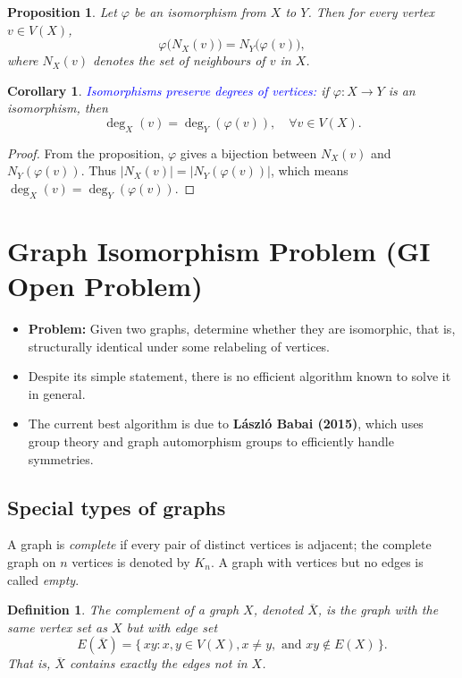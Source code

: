 \documentclass[12pt,a4paper,openany]{book}
\newtheorem{definition}{Definition}[section]
\newtheorem{proposition}{Proposition}[section]
\newtheorem{corollary}{Corollary}[section]
\begin{document}
\begin{proposition}
Let $\varphi$ be an isomorphism from $X$ to $Y$. Then for every vertex $v \in V(X)$,
\[
\varphi\big(N_X(v)\big) = N_Y\big(\varphi(v)\big),
\]
where $N_X(v)$ denotes the set of neighbours of $v$ in $X$.
\end{proposition}

\begin{corollary}
\textcolor{blue}{Isomorphisms preserve degrees of vertices:} if $\varphi : X \to Y$ is an isomorphism, then
\[
\deg_X(v) = \deg_Y(\varphi(v)), \quad \forall v \in V(X).
\]
\end{corollary}
\begin{proof}
From the proposition, $\varphi$ gives a bijection between $N_X(v)$ and $N_Y(\varphi(v))$.  
Thus $|N_X(v)| = |N_Y(\varphi(v))|$, which means $\deg_X(v) = \deg_Y(\varphi(v))$.
\end{proof}
\section*{Graph Isomorphism Problem (GI Open Problem)}

\begin{itemize}
    \item \textbf{Problem:} Given two graphs, determine whether they are isomorphic, that is, structurally identical under some relabeling of vertices.
    \item Despite its simple statement, there is no efficient algorithm known to solve it in general.
    \item The current best algorithm is due to \textbf{L\'aszl\'o Babai (2015)}, which  uses group theory and graph automorphism groups to efficiently handle symmetries.
\end{itemize}

\subsection*{Special types of graphs}
A graph is \emph{complete} if every pair of distinct vertices is adjacent; the complete graph on $n$ vertices is denoted by $K_n$.  
A graph with vertices but no edges is called \emph{empty}.  
\begin{definition}
The \emph{complement} of a graph $X$, denoted $\overline{X}$, is the graph with the same vertex set as $X$ but with edge set
\[
E(\overline{X}) = \{\, xy : x,y \in V(X), x \neq y, \text{ and } xy \notin E(X) \,\}.
\]
That is, $\overline{X}$ contains exactly the edges not in $X$. 
\end{definition}
\end{document}
